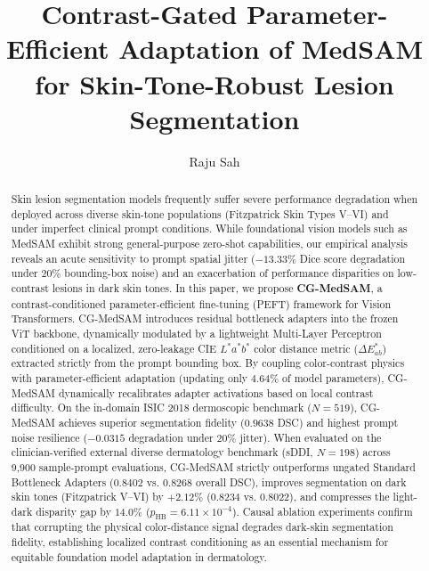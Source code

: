 \documentclass[runningheads]{llncs}
\begin{document}
\title{Contrast-Gated Parameter-Efficient Adaptation of MedSAM for Skin-Tone-Robust Lesion Segmentation}

\author{Raju Sah}

\maketitle

\begin{abstract}
Skin lesion segmentation models frequently suffer severe performance degradation when deployed across diverse skin-tone populations (Fitzpatrick Skin Types V--VI) and under imperfect clinical prompt conditions. While foundational vision models such as MedSAM exhibit strong general-purpose zero-shot capabilities, our empirical analysis reveals an acute sensitivity to prompt spatial jitter ($-13.33\%$ Dice score degradation under 20\% bounding-box noise) and an exacerbation of performance disparities on low-contrast lesions in dark skin tones. In this paper, we propose \textbf{CG-MedSAM}, a contrast-conditioned parameter-efficient fine-tuning (PEFT) framework for Vision Transformers. CG-MedSAM introduces residual bottleneck adapters into the frozen ViT backbone, dynamically modulated by a lightweight Multi-Layer Perceptron conditioned on a localized, zero-leakage CIE $L^*a^*b^*$ color distance metric ($\Delta E^*_{ab}$) extracted strictly from the prompt bounding box. By coupling color-contrast physics with parameter-efficient adaptation (updating only $4.64\%$ of model parameters), CG-MedSAM dynamically recalibrates adapter activations based on local contrast difficulty. On the in-domain ISIC 2018 dermoscopic benchmark ($N=519$), CG-MedSAM achieves superior segmentation fidelity ($0.9638$ DSC) and highest prompt noise resilience ($-0.0315$ degradation under 20\% jitter). When evaluated on the clinician-verified external diverse dermatology benchmark (sDDI, $N=198$) across 9,900 sample-prompt evaluations, CG-MedSAM strictly outperforms ungated Standard Bottleneck Adapters ($0.8402$ vs. $0.8268$ overall DSC), improves segmentation on dark skin tones (Fitzpatrick V--VI) by $+2.12\%$ ($0.8234$ vs. $0.8022$), and compresses the light-dark disparity gap by $14.0\%$ ($p_{\text{HB}} = 6.11 \times 10^{-4}$). Causal ablation experiments confirm that corrupting the physical color-distance signal degrades dark-skin segmentation fidelity, establishing localized contrast conditioning as an essential mechanism for equitable foundation model adaptation in dermatology.

\end{abstract}
\end{document}
